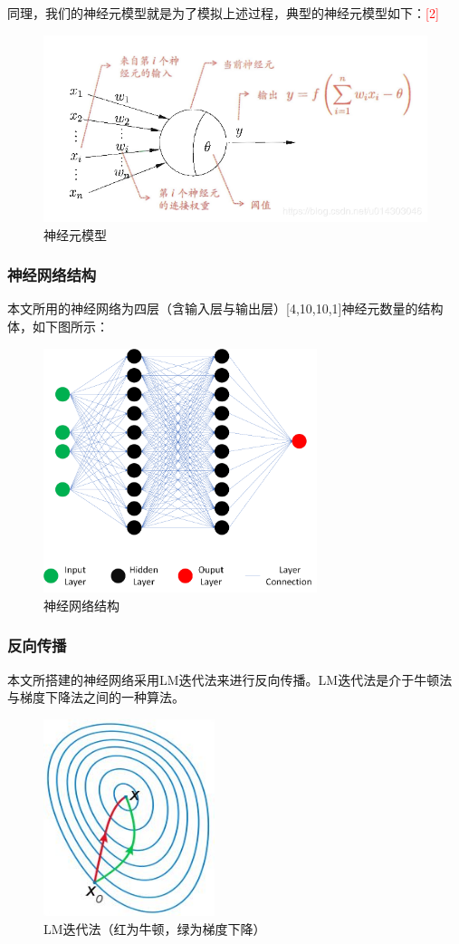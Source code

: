 \documentclass{ctexart}
\newcounter{sub}
\begin{document}
同理，我们的神经元模型就是为了模拟上述过程，典型的神经元模型如下：\textcolor{red}{[2]}
\renewcommand\figurename{图}
\begin{figure}[H]
	\centering
	\includegraphics[width=13cm]{shenjing.png}
	\caption{神经元模型} \label{all}
\end{figure}

\subsubsection{神经网络结构}
本文所用的神经网络为四层（含输入层与输出层）[4,10,10,1]神经元数量的结构体，如下图所示：
\renewcommand\figurename{图}
\begin{figure}[H]
	\centering
	\includegraphics[width=8cm]{jiegou.png}
	\caption{神经网络结构} \label{all}
\end{figure}

\subsubsection{反向传播}
本文所搭建的神经网络采用LM迭代法来进行反向传播。LM迭代法是介于牛顿法与梯度下降法之间的一种算法。
\renewcommand\figurename{图}
\begin{figure}[H]
	\centering
	\includegraphics[width=5cm]{fanxiang.png}
	\caption{LM迭代法（红为牛顿，绿为梯度下降）} \label{all}
\end{figure}
\end{document}
